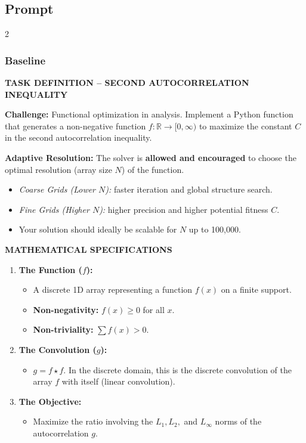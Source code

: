 \documentclass[sigconf]{acmart}
\begin{document}
\onecolumn
\subsection{Prompt}
\begin{paracol}{2}
\subsubsection{Baseline}
\noindent \textbf{TASK DEFINITION -- SECOND AUTOCORRELATION INEQUALITY}

\vspace{0.3cm}
\noindent \textbf{Challenge:} Functional optimization in analysis. Implement a Python function that generates a non-negative function $f: \mathbb{R} \to [0, \infty)$ to maximize the constant $C$ in the second autocorrelation inequality.

\vspace{0.3cm}
\noindent \textbf{Adaptive Resolution:} The solver is \textbf{allowed and encouraged} to choose the optimal resolution (array size $N$) of the function.
\begin{itemize}
    \item \textit{Coarse Grids (Lower $N$):} faster iteration and global structure search.
    \item \textit{Fine Grids (Higher $N$):} higher precision and higher potential fitness $C$.
    \item Your solution should ideally be scalable for $N$ up to 100,000.
\end{itemize}

\vspace{0.3cm}
\noindent \textbf{MATHEMATICAL SPECIFICATIONS}
\begin{enumerate}
    \item \textbf{The Function ($f$):}
    \begin{itemize}
        \item A discrete 1D array representing a function $f(x)$ on a finite support.
        \item \textbf{Non-negativity:} $f(x) \ge 0$ for all $x$.
        \item \textbf{Non-triviality:} $\sum f(x) > 0$.
    \end{itemize}
    \item \textbf{The Convolution ($g$):}
    \begin{itemize}
        \item $g = f \star f$. In the discrete domain, this is the discrete convolution of the array $f$ with itself (linear convolution).
    \end{itemize}
    \item \textbf{The Objective:}
    \begin{itemize}
        \item Maximize the ratio involving the $L_1, L_2,$ and $L_\infty$ norms of the autocorrelation $g$.
    \end{itemize}
\end{enumerate}


\end{paracol}
\end{document}
